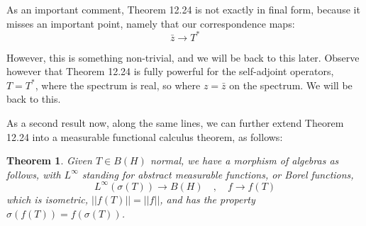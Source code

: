 \documentclass[12pt]{amsbook}
\newtheorem{theorem}{Theorem}[chapter]
\begin{document}
As an important comment, Theorem 12.24 is not exactly in final form, because it misses an important point, namely that our correspondence maps:
$$\bar{z}\to T^*$$

However, this is something non-trivial, and we will be back to this later. Observe however that Theorem 12.24 is fully powerful for the self-adjoint operators, $T=T^*$, where the spectrum is real, so where $z=\bar{z}$ on the spectrum. We will be back to this.

\bigskip

As a second result now, along the same lines, we can further extend Theorem 12.24 into a measurable functional calculus theorem, as follows:


\begin{theorem}
Given $T\in B(H)$ normal, we have a morphism of algebras as follows, with $L^\infty$ standing for abstract measurable functions, or Borel functions,
$$L^\infty(\sigma(T))\to B(H)\quad,\quad 
f\to f(T)$$
which is isometric, $||f(T)||=||f||$, and has the property $\sigma(f(T))=f(\sigma(T))$.
\end{theorem}
\end{document}
